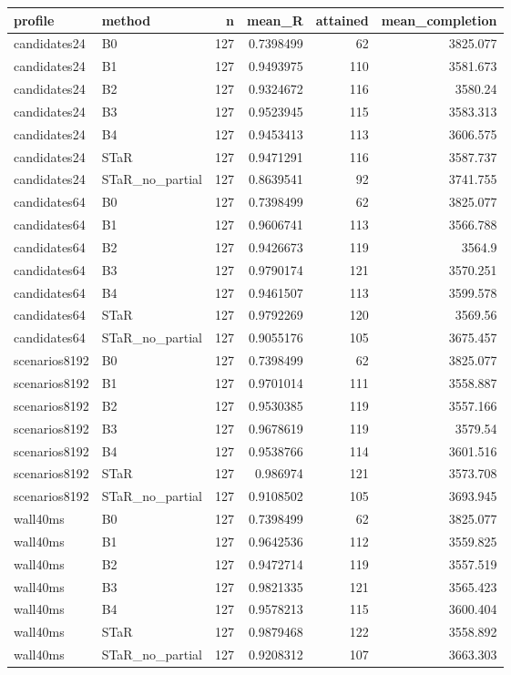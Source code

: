 \begin{tabular}{llrrrr}
\hline
profile & method & n & mean\_R & attained & mean\_completion \\
\hline
candidates24 & B0 & 127 & 0.7398499 & 62 & 3825.077 \\
candidates24 & B1 & 127 & 0.9493975 & 110 & 3581.673 \\
candidates24 & B2 & 127 & 0.9324672 & 116 & 3580.24 \\
candidates24 & B3 & 127 & 0.9523945 & 115 & 3583.313 \\
candidates24 & B4 & 127 & 0.9453413 & 113 & 3606.575 \\
candidates24 & STaR & 127 & 0.9471291 & 116 & 3587.737 \\
candidates24 & STaR\_no\_partial & 127 & 0.8639541 & 92 & 3741.755 \\
candidates64 & B0 & 127 & 0.7398499 & 62 & 3825.077 \\
candidates64 & B1 & 127 & 0.9606741 & 113 & 3566.788 \\
candidates64 & B2 & 127 & 0.9426673 & 119 & 3564.9 \\
candidates64 & B3 & 127 & 0.9790174 & 121 & 3570.251 \\
candidates64 & B4 & 127 & 0.9461507 & 113 & 3599.578 \\
candidates64 & STaR & 127 & 0.9792269 & 120 & 3569.56 \\
candidates64 & STaR\_no\_partial & 127 & 0.9055176 & 105 & 3675.457 \\
scenarios8192 & B0 & 127 & 0.7398499 & 62 & 3825.077 \\
scenarios8192 & B1 & 127 & 0.9701014 & 111 & 3558.887 \\
scenarios8192 & B2 & 127 & 0.9530385 & 119 & 3557.166 \\
scenarios8192 & B3 & 127 & 0.9678619 & 119 & 3579.54 \\
scenarios8192 & B4 & 127 & 0.9538766 & 114 & 3601.516 \\
scenarios8192 & STaR & 127 & 0.986974 & 121 & 3573.708 \\
scenarios8192 & STaR\_no\_partial & 127 & 0.9108502 & 105 & 3693.945 \\
wall40ms & B0 & 127 & 0.7398499 & 62 & 3825.077 \\
wall40ms & B1 & 127 & 0.9642536 & 112 & 3559.825 \\
wall40ms & B2 & 127 & 0.9472714 & 119 & 3557.519 \\
wall40ms & B3 & 127 & 0.9821335 & 121 & 3565.423 \\
wall40ms & B4 & 127 & 0.9578213 & 115 & 3600.404 \\
wall40ms & STaR & 127 & 0.9879468 & 122 & 3558.892 \\
wall40ms & STaR\_no\_partial & 127 & 0.9208312 & 107 & 3663.303 \\
\hline
\end{tabular}
